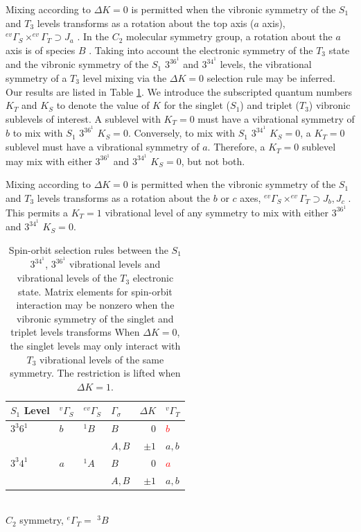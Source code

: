\documentclass[12pt]{mitthesis}
\begin{document}
Mixing according to $\Delta K =0$ is permitted when the vibronic
symmetry of the $S_1$ and $T_3$ levels transforms as a rotation about
the top axis ($a$ axis), $^{ev}\Gamma_S \times ^{ev}\Gamma_T \supset
J_a$ \cite{stevens73}.  In the $C_2$ molecular symmetry group, a
rotation about the $a$ axis is of species $B$ \cite{bunker98}.  Taking
into account the electronic symmetry of the $T_3$ state and the
vibronic symmetry of the $S_1$ $3^36^1$ and $3^34^1$ levels, the
vibrational symmetry of a $T_3$ level mixing via the $\Delta K=0$
selection rule may be inferred.  Our results are listed in Table
\ref{table:delta-k}.  We introduce the subscripted quantum numbers
$K_T$ and $K_S$ to denote the value of $K$ for the singlet ($S_1$) and
triplet ($T_3$) vibronic sublevels of interest.  A sublevel with
$K_T=0$ must have a vibrational symmetry of $b$ to mix with $S_1$
$3^36^1$ $K_S=0$.  Conversely, to mix with $S_1$ $3^34^1$ $K_S=0$, a
$K_T=0$ sublevel must have a vibrational symmetry of $a$.  Therefore,
a $K_T=0$ sublevel may mix with either $3^36^1$ and $3^34^1$ $K_S=0$,
but not both.

Mixing according to $\Delta K =0$ is permitted when the vibronic
symmetry of the $S_1$ and $T_3$ levels transforms as a rotation about
the $b$ or $c$ axes, $^{ev}\Gamma_S \times ^{ev}\Gamma_T \supset J_b,
J_c$ \cite{stevens73}.  This permits a $K_T=1$ vibrational level of
any symmetry to mix with either $3^36^1$ and $3^34^1$ $K_S=0$.

\begin{table}
  \caption{Spin-orbit selection rules between the $S_1$ $3^34^1$,
    $3^36^1$ vibrational levels and vibrational levels of the $T_3$
    electronic state.  Matrix elements for spin-orbit interaction may be nonzero when the vibronic symmetry of 
    the singlet and triplet levels transforms When $\Delta K=0$, the singlet 
    levels may only
    interact with $T_3$ vibrational levels of the same symmetry.  The
    restriction is lifted when $\Delta K=1$.}
  \label{table:delta-k}
  \centering
  \begin{tabular}{llllrl}
    \\
    $S_1$ Level
    & $^{v}\Gamma_S$ & $^{ev}\Gamma_S$ & $\Gamma_\sigma$ & $\Delta K$ & $^{v}\Gamma_T$ \\
    \toprule
    
    $3^3 6^1$ 
    & $b$ & $^{1}B$ & $B$ & $0$ & \textcolor{red}{$b$} \\
    & & & $A, B$ & $\pm1$ & $a, b$ \\
    
    $3^3 4^1$ 
    & $a$ & $^{1}A$ & $B$ & $0$ & \textcolor{red}{$a$} \\
    & & & $A, B$ & $\pm1$ & $a, b$ \\[10pt]
    
  \end{tabular}\\[5mm]
  
  $C_{2}$ symmetry, $^{e}\Gamma_T =$ $^{3}B$
\end{table}
\end{document}
